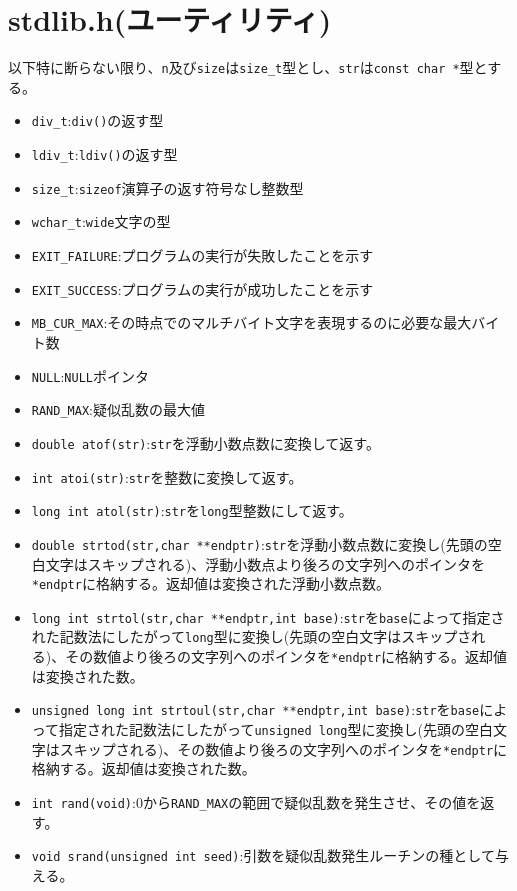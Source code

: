 \section{stdlib.h(ユーティリティ)}
以下特に断らない限り、\verb|n|及び\verb|size|は\verb|size_t|型とし、\verb|str|は\verb|const char *|型とする。
\begin{itemize}
\item \verb|div_t|:\verb|div()|の返す型
\item \verb|ldiv_t|:\verb|ldiv()|の返す型
\item \verb|size_t|:\verb|sizeof|演算子の返す符号なし整数型
\item \verb|wchar_t|:\verb|wide|文字の型
\item \verb|EXIT_FAILURE|:プログラムの実行が失敗したことを示す
\item \verb|EXIT_SUCCESS|:プログラムの実行が成功したことを示す
\item \verb|MB_CUR_MAX|:その時点でのマルチバイト文字を表現するのに必要な最大バイト数
\item \verb|NULL|:\verb|NULL|ポインタ
\item \verb|RAND_MAX|:疑似乱数の最大値
\item \verb|double atof(str)|:\verb|str|を浮動小数点数に変換して返す。
\item \verb|int atoi(str)|:\verb|str|を整数に変換して返す。
\item \verb|long int atol(str)|:\verb|str|を\verb|long|型整数にして返す。
\item \verb|double strtod(str,char **endptr)|:\verb|str|を浮動小数点数に変換し(先頭の空白文字はスキップされる)、浮動小数点より後ろの文字列へのポインタを\verb|*endptr|に格納する。返却値は変換された浮動小数点数。
\item \verb|long int strtol(str,char **endptr,int base)|:\verb|str|を\verb|base|によって指定された記数法にしたがって\verb|long|型に変換し(先頭の空白文字はスキップされる)、その数値より後ろの文字列へのポインタを\verb|*endptr|に格納する。返却値は変換された数。
\item \verb|unsigned long int strtoul(str,char **endptr,int base)|:\verb|str|を\verb|base|によって指定された記数法にしたがって\verb|unsigned long|型に変換し(先頭の空白文字はスキップされる)、その数値より後ろの文字列へのポインタを\verb|*endptr|に格納する。返却値は変換された数。
\item \verb|int rand(void)|:0から\verb|RAND_MAX|の範囲で疑似乱数を発生させ、その値を返す。
\item \verb|void srand(unsigned int seed)|:引数を疑似乱数発生ルーチンの種として与える。

\end{itemize}
